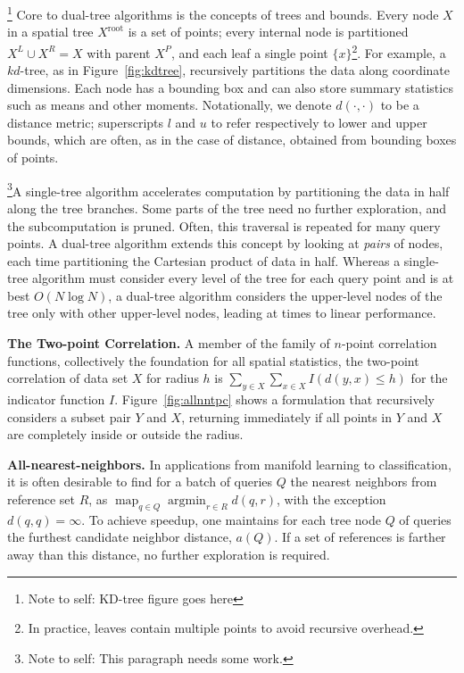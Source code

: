 \documentclass[times, leqno,twocolumn]{article}
\newcommand{\authornote}[1]{\footnote{Note to self: #1}}
\newcommand{\union}{\cup}
\DeclareMathOperator*{\map}{map}
\DeclareMathOperator*{\argmin}{argmin}
\newcommand{\fig}[1]{Figure~\ref{fig:#1}}
\newcommand{\kdroot}[1]{#1^{\text{root}}}
\newcommand{\kdleft}[1]{#1^{\!L}}
\newcommand{\kdright}[1]{#1^{\!R}}
\newcommand{\kdparent}[1]{#1^{\!P}}
\newcommand{\dist}[2]{d(#1,#2)}
\begin{document}
\authornote{KD-tree figure goes here}
Core to dual-tree algorithms is the concepts of trees and bounds.
Every node $X$ in a spatial tree $\kdroot{X}$ is a set of points; every internal node is partitioned $\kdleft{X} \union \kdright{X} = X$ with parent $\kdparent{X}$, and each leaf a single point $\{x\}$\footnote{In practice, leaves contain multiple points to avoid recursive overhead.}.
For example, a $kd$-tree\cite{kdtree}, as in \fig{kdtree}, recursively partitions the data along coordinate dimensions.
Each node has a bounding box and can also store summary statistics such as means and other moments.
Notationally, we denote $\dist{\cdot}{\cdot}$ to be a distance metric; superscripts $l$ and $u$ to refer respectively to lower and upper bounds, which are often, as in the case of distance, obtained from bounding boxes of points.

\authornote{This paragraph needs some work.}A single-tree algorithm accelerates computation by partitioning the data in half along the tree branches.
Some parts of the tree need no further exploration, and the subcomputation is pruned.
Often, this traversal is repeated for many query points.
A dual-tree algorithm extends this concept by looking at {\it pairs} of nodes, each time partitioning the Cartesian product of data in half.
Whereas a single-tree algorithm must consider every level of the tree for each query point and is at best $O(N \log N)$, a dual-tree algorithm considers the upper-level nodes of the tree only with other upper-level nodes, leading at times to linear performance.

{\bf The Two-point Correlation.} A member of the family of $n$-point correlation functions, collectively the foundation for all spatial statistics, the two-point correlation of data set $X$ for radius $h$ is
$\sum_{y \in X} \sum_{x \in X} I(d(y, x) \leq h)$ for the indicator function $I$.
Figure~\ref{fig:allnntpc} shows a formulation that recursively considers a subset pair $Y$ and $X$, returning immediately if all points in $Y$ and $X$ are completely inside or outside the radius.

{\bf All-nearest-neighbors.} In applications from manifold learning to classification, it is often desirable to find for a batch of queries $Q$ the nearest neighbors from reference set $R$, as $\map_{q \in Q} \argmin_{r \in R} d(q,r)$, with the exception $d(q,q) = \infty$.
To achieve speedup, one maintains for each tree node $Q$ of queries the furthest candidate neighbor distance, $a(Q)$.
If a set of references is farther away than this distance, no further exploration is required.
\end{document}
